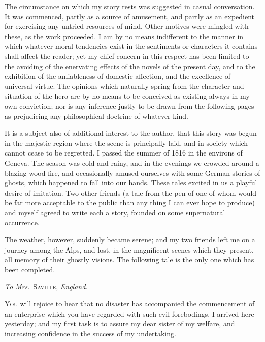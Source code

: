 The circumstance on which my
story rests was suggested in casual
conversation. It was commenced,
partly as a source of amusement,
and partly as an expedient for exercising
any untried resources of
mind. Other motives were mingled
with these, as the work proceeded.
I am by no means indifferent
to the manner in which
whatever moral tendencies exist in
the sentiments or characters it contains
shall affect the reader; yet
my chief concern in this respect
has been limited to the avoiding
of the enervating effects of the novels
of the present day, and to the exhibition
of the amiableness of domestic
affection, and the excellence
of universal virtue. The opinions
which naturally spring from the
character and situation of the hero
are by no means to be conceived
as existing always in my own conviction;
nor is any inference justly
to be drawn from the following
pages as prejudicing any philosophical
doctrine of whatever kind.

It is a subject also of additional
interest to the author, that this
story was begun in the majestic
region where the scene is principally
laid, and in society which
cannot cease to be regretted. I
passed the summer of 1816 in the
environs of Geneva. The season
was cold and rainy, and in the
evenings we crowded around a
blazing wood fire, and occasionally
amused ourselves with some German
stories of ghosts, which happened
to fall into our hands.
These tales excited in us a playful
desire of imitation. Two other
friends (a tale from the pen of one
of whom would be far more acceptable
to the public than any thing
I can ever hope to produce) and
myself agreed to write each a story,
founded on some supernatural occurrence.

The weather, however, suddenly
became ser\-ene; and my two friends
left me on a journey among the
Alps, and lost, in the magnificent
scenes which they present, all memory
of their ghostly visions. The
following tale is the only one which
has been completed.
\mainmatter
{}

\emph{To Mrs.}~\textsc{Saville}, \emph{England}.


\noindent\textsc{You} will rejoice to hear that no disaster
has accompanied the commencement
of an enterprise which you have
regarded with such evil forebodings.
I arrived here yesterday; and my first
task is to assure my dear sister of my
welfare, and increasing confidence in
the success of my undertaking.

